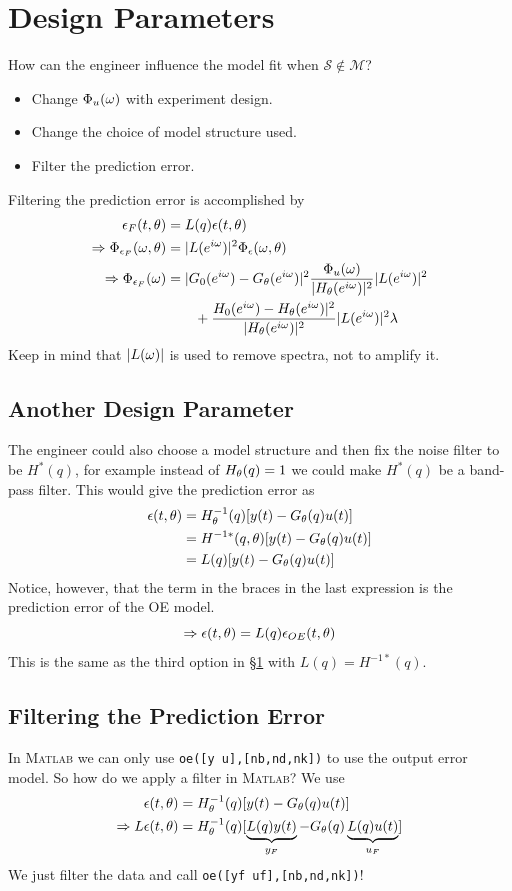 \section{Design Parameters}
\label{sec:16dp}
How can the engineer influence the model fit when $\mathcal{S}\notin\mathcal{M}$?
\begin{itemize}
\item Change $\Phi_u(\omega)$ with experiment design.
\item Change the choice of model structure used.
\item Filter the prediction error.
\end{itemize}
Filtering the prediction error is accomplished by
\begin{align*}
\epsilon_F(t,\theta) &= L(q)\epsilon(t,\theta) \\
\Rightarrow \Phi_{\epsilon_F}(\omega,\theta) &= |L(e^{i\omega})|^2\Phi_\epsilon(\omega,\theta) \\
\Rightarrow \Phi_{\epsilon_F}(\omega) &= |G_0(e^{i\omega}) - G_\theta(e^{i\omega})|^2\frac{\Phi_u(\omega)}{|H_\theta(e^{i\omega})|^2}|L(e^{i\omega})|^2 \\
&\qquad + \frac{H_0(e^{i\omega}) - H_\theta(e^{i\omega})|^2}{|H_\theta(e^{i\omega})|^2}|L(e^{i\omega})|^2\lambda
\end{align*}
Keep in mind that $|L(\omega)|$ is used to remove spectra, not to amplify it.

\subsection{Another Design Parameter}
The engineer could also choose a model structure and then fix the noise filter to be $H^\ast(q)$, for example instead of $H_\theta(q)=1$ we could make $H^\ast(q)$ be a band-pass filter. This would give the prediction error as
\begin{align*}
\epsilon(t,\theta) &= H_\theta^{-1}(q)[y(t)-G_\theta(q) u(t)] \\
&= H^{-1\ast}(q,\theta)[y(t) - G_\theta(q) u(t)] \\
&= L(q)[y(t) - G_\theta(q) u(t)]
\end{align*}
Notice, however, that the term in the braces in the last expression is the prediction error of the OE model.
$$\Rightarrow \epsilon(t,\theta) = L(q)\epsilon_{OE}(t,\theta)$$
This is the same as the third option in \S\ref{sec:16dp} with $L(q)=H^{-1\ast}(q)$.

\subsection{Filtering the Prediction Error}
In \textsc{Matlab} we can only use \texttt{oe([y u],[nb,nd,nk])} to use the output error model. So how do we apply a filter in \textsc{Matlab}? We use
\begin{align*}
\epsilon(t,\theta) &= H_\theta^{-1}(q)[y(t)-G_\theta(q) u(t)] \\
\Rightarrow L\epsilon(t,\theta) &= H_\theta^{-1}(q)[\underbrace{L(q)y(t)}_{y_F} - G_\theta(q) \underbrace{L(q)u(t)}_{u_F}]
\end{align*}
We just filter the data and call \texttt{oe([yf uf],[nb,nd,nk])}!

